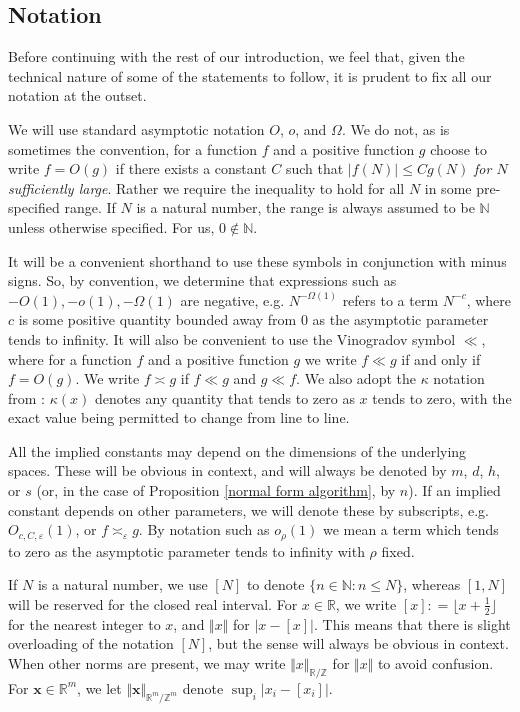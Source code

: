 \documentclass[12pt,a4paper,twoside,reqno]{amsart}
\numberwithin{equation}{section}
\begin{document}
\subsection{Notation}
\label{Section Notation}
Before continuing with the rest of our introduction, we feel that, given the technical nature of some of the statements to follow, it is prudent to fix all our notation at the outset. 

We will use standard asymptotic notation $O$, $o$, and $\Omega$. We do not, as is sometimes the convention, for a function $f$ and a positive function $g$ choose to write $f = O(g)$ if there exists a constant $C$ such that $\vert f(N)\vert \leqslant C g(N) $ \emph{for $N$ sufficiently large}. Rather we require the inequality to hold for all $N$ in some pre-specified range. If $N$ is a natural number, the range is always assumed to be $\mathbb{N}$ unless otherwise specified. For us, $0\notin \mathbb{N}$. 

It will be a convenient shorthand to use these symbols in conjunction with minus signs. So, by convention, we determine that expressions such as $-O(1), -o(1), -\Omega(1)$ are negative, e.g. $N^{-\Omega(1)}$ refers to a term $N^{-c}$, where $c$ is some positive quantity bounded away from $0$ as the asymptotic parameter tends to infinity. It will also be convenient to use the Vinogradov symbol $\ll$, where for a function $f$ and a positive function $g$ we write $f\ll g$ if and only if $f = O(g)$. We write $f\asymp g$ if $f\ll g$ and $g\ll f$. We also adopt the $\kappa$ notation from \cite{GT10}: $\kappa(x)$ denotes any quantity that tends to zero as $x$ tends to zero, with the exact value being permitted to change from line to line.

All the implied constants may depend on the dimensions of the underlying spaces. These will be obvious in context, and will always be denoted by $m$, $d$, $h$, or $s$ (or, in the case of Proposition \ref{normal form algorithm}, by $n$). If an implied constant depends on other parameters, we will denote these by subscripts, e.g. $O_{c,C,\varepsilon}(1)$, or $f\asymp_{\varepsilon} g$. By notation such as $o_\rho(1)$ we mean a term which tends to zero as the asymptotic parameter tends to infinity with $\rho$ fixed. 

If $N$ is a natural number, we use $[N]$ to denote $\{n\in \mathbb{N}:n\leqslant N\}$, whereas $[1,N]$ will be reserved for the closed real interval. For $x \in \mathbb{R}$, we write $[x]: = \lfloor x+\frac{1}{2}\rfloor$ for the nearest integer to $x$, and $\Vert x \Vert$ for $\vert x - [x] \vert$. This means that there is slight overloading of the notation $[N]$, but the sense will always be obvious in context. When other norms are present, we may write $\Vert x\Vert_{\mathbb{R}/\mathbb{Z}}$ for $\Vert x \Vert$ to avoid confusion. For $\mathbf{x} \in \mathbb{R}^m$, we let $\Vert \mathbf{x}\Vert_{\mathbb{R}^m/\mathbb{Z}^m}$ denote  $\sup_i \vert x_i - [x_i]\vert$.
\end{document}

